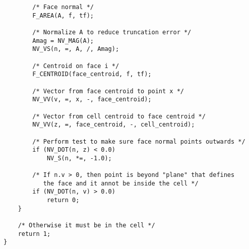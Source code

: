 \begin{verbatim}
        /* Face normal */
        F_AREA(A, f, tf);

        /* Normalize A to reduce truncation error */
        Amag = NV_MAG(A);
        NV_VS(n, =, A, /, Amag);

        /* Centroid on face i */
        F_CENTROID(face_centroid, f, tf);

        /* Vector from face centroid to point x */
        NV_VV(v, =, x, -, face_centroid);

        /* Vector from cell centroid to face centroid */
        NV_VV(z, =, face_centroid, -, cell_centroid);

        /* Perform test to make sure face normal points outwards */
        if (NV_DOT(n, z) < 0.0)
            NV_S(n, *=, -1.0);

        /* If n.v > 0, then point is beyond "plane" that defines 
           the face and it annot be inside the cell */
        if (NV_DOT(n, v) > 0.0)
            return 0;
    }
    
    /* Otherwise it must be in the cell */
    return 1;
}

\end{verbatim}

